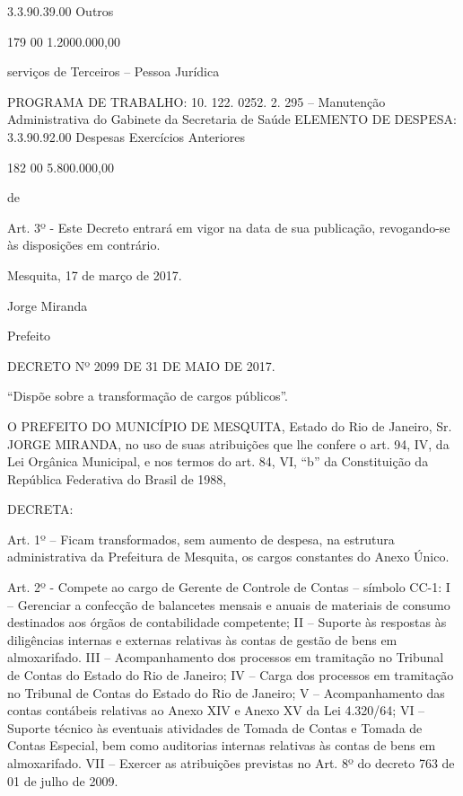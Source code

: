 \documentclass{doliberto}
\begin{document}
3.3.90.39.00  Outros 

179  00  1.2000.000,00 

serviços  de 
Terceiros 
– 
Pessoa 
Jurídica 

 
 
PROGRAMA DE TRABALHO: 
10.  122.  0252.  2.  295  –  Manutenção  Administrativa  do 
Gabinete da Secretaria de Saúde  
ELEMENTO DE DESPESA: 
3.3.90.92.00  Despesas 
Exercícios 
Anteriores 

182  00  5.800.000,00 

de 

 
Art.  3º  -  Este  Decreto  entrará  em  vigor  na  data  de  sua 
publicação, revogando-se às disposições em contrário.  
 
 

Mesquita, 17 de março de 2017.  

Jorge Miranda 

Prefeito 

DECRETO Nº 2099 DE 31 DE MAIO DE 2017. 

“Dispõe sobre a transformação de cargos públicos”. 
 
O PREFEITO DO MUNICÍPIO DE MESQUITA, Estado do Rio 
de Janeiro, Sr. JORGE MIRANDA, no uso de suas atribuições 
que lhe confere o art. 94, IV, da Lei Orgânica Municipal, e nos 
termos  do  art.  84,  VI,  “b”  da  Constituição  da  República 
Federativa do Brasil de 1988, 
 
DECRETA: 
 
Art. 1º – Ficam transformados, sem aumento de despesa, na 
estrutura  administrativa  da  Prefeitura  de  Mesquita,  os 
cargos constantes do Anexo Único. 


Art.  2º  -    Compete  ao  cargo    de    Gerente  de  Controle  de 
Contas – símbolo CC-1: 
I – Gerenciar a confecção de balancetes mensais e anuais de 
materiais  de  consumo  destinados  aos  órgãos  de 
contabilidade competente; 
II – Suporte às respostas às diligências internas e externas 
relativas às contas de gestão de bens em almoxarifado. 
III  –  Acompanhamento  dos  processos  em  tramitação  no 
Tribunal de Contas do Estado do Rio de Janeiro; 
IV  –  Carga  dos  processos  em  tramitação  no  Tribunal  de 
Contas do Estado do Rio de Janeiro; 
V  –  Acompanhamento  das  contas  contábeis  relativas  ao 
Anexo XIV e Anexo XV da Lei 4.320/64; 
VI – Suporte técnico às eventuais atividades de Tomada de 
Contas e Tomada de Contas Especial, bem como auditorias 
internas relativas às contas de bens em almoxarifado. 
VII – Exercer as atribuições previstas no Art. 8º do decreto 
763 de 01 de julho de 2009. 
 
\end{document}

